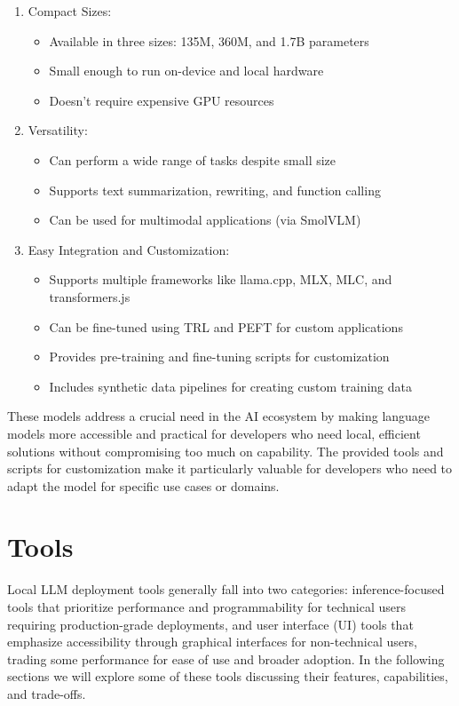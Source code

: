\begin{enumerate}
\item Compact Sizes:
\begin{itemize}
    \item Available in three sizes: 135M, 360M, and 1.7B parameters
    \item Small enough to run on-device and local hardware
    \item Doesn't require expensive GPU resources
\end{itemize}

\item Versatility:
\begin{itemize}
    \item Can perform a wide range of tasks despite small size
    \item Supports text summarization, rewriting, and function calling
    \item Can be used for multimodal applications (via SmolVLM)
\end{itemize}

\item Easy Integration and Customization:
\begin{itemize}
    \item Supports multiple frameworks like llama.cpp, MLX, MLC, and transformers.js
    \item Can be fine-tuned using TRL and PEFT for custom applications
    \item Provides pre-training and fine-tuning scripts for customization
    \item Includes synthetic data pipelines for creating custom training data
\end{itemize}
\end{enumerate}

These models address a crucial need in the AI ecosystem by making language models more accessible and practical for developers who need local, efficient solutions without compromising too much on capability. The provided tools and scripts for customization make it particularly valuable for developers who need to adapt the model for specific use cases or domains.

\section{Tools}

Local LLM deployment tools generally fall into two categories: inference-focused tools that prioritize performance and programmability for technical users requiring production-grade deployments, and user interface (UI) tools that emphasize accessibility through graphical interfaces for non-technical users, trading some performance for ease of use and broader adoption. In the following sections we will explore some of these tools discussing their features, capabilities, and trade-offs.

